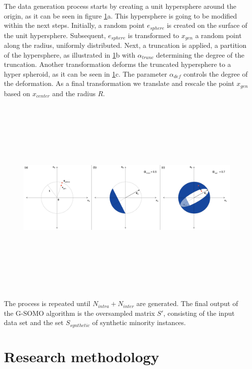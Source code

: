 \documentclass[parskip=full]{scrartcl}
\begin{document}
The data generation process starts by creating a unit hypersphere around the origin, as it can be seen in figure \ref{fig:Hypersphere}a. This hypersphere is going to be modified within the next steps. Initially, a random point $e_{sphere}$ is created on the surface of the unit hypersphere. Subsequent, $e_{sphere}$ is transformed to $x_{gen}$ a random point along the radius, uniformly distributed. Next, a truncation is applied, a partition of the hypersphere, as illustrated in \ref{fig:Hypersphere}b with $\alpha_{trunc}$ determining the degree of the truncation. Another transformation deforms the truncated hypersphere to a hyper spheroid, as it can be seen in \ref{fig:Hypersphere}c. The parameter $\alpha_{def}$ controls the degree of the deformation.  As a final transformation we translate and rescale the point $x_{gen}$ based on $x_{center}$ and the radius $R$.

\begin{figure}[H]
	\centering
	\includegraphics[width=15cm,height=10cm, keepaspectratio]{../analysis/fig6.png}
	\label{fig:Hypersphere}
\end{figure}

The process is repeated until $N_{intra} + N_{inter}$ are generated. The final output of the G-SOMO algorithm is the oversampled matrix $S'$, consisting of the input data set and the set $S_{synthetic}$ of synthetic minority instances.

\section{Research methodology}
\end{document}
